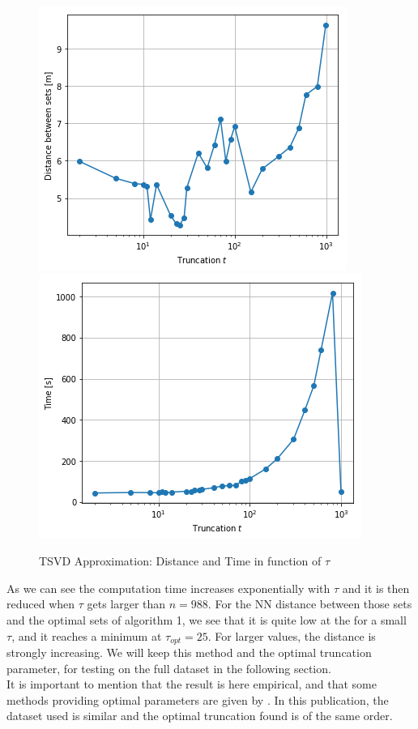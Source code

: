 \begin{figure}[h]
\centering
\includegraphics[height=0.33\linewidth]{figures/CompAlg/tsvd/dist_trunc}
~
\includegraphics[height=0.33\linewidth]{figures/CompAlg/tsvd/time_trunc}
\caption{TSVD Approximation: Distance and Time in function of $\tau$}
\label{fig:small_set:tsvd}
\end{figure}

As we can see the computation time increases exponentially with $\tau$ and it is then reduced when $\tau$ gets larger than $n=988$.  For the NN distance between those sets and the optimal sets of algorithm 1, we see that it is quite low at the for a small $\tau$, and it reaches a minimum at $\tau_{opt} = 25$. For larger values, the distance is strongly increasing.  We will keep this method and the optimal truncation parameter, for testing on the full dataset in the following section. \\

It is important to mention that the result is here empirical, and that some methods providing optimal parameters are given by \citet{arcucci_optimal_2019}. In this publication, the dataset used is similar and the optimal truncation found is of the same order.  \\

